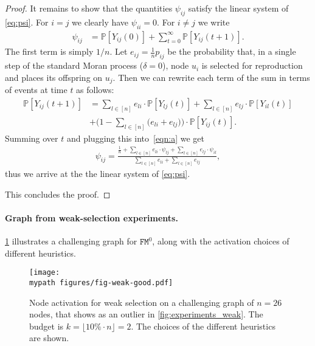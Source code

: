 \documentclass[letterpaper]{article}
\def\mypath{}
\def\Pr{\mathbb{P}}
\newcommand{\NodeActivationMoranWeak}{\texttt{FM}^{0}}
\newcommand{\FitAdv}{\delta}
\begin{document}
\begin{proof}
It remains to show that the quantities $\psi_{ij}$ satisfy the linear system of \cref{eq:psi}.
For $i=j$ we clearly have $\psi_{ii}=0$.
For $i\neq j$ we write
\begin{align}\label{eqn:a}
\psi_{ij}  &=\Pr[Y_{ij}(0)] + \sum_{t=0}^{\infty}\Pr[Y_{ij}(t+1)].
\end{align}
The first term is simply $1/n$.
Let $e_{ij}=\frac{1}{n}p_{ij}$ be the probability that, in a single step of the standard Moran process ($\FitAdv=0$), node $u_i$ is selected for reproduction and places its offspring on $u_j$. 
Then we can rewrite each term of the sum in terms of events at time $t$ as follows:
\begin{align*}
\Pr[Y_{ij}(t+1)] &= \sum_{l\in[n]} e_{li}\cdot \Pr[Y_{lj}(t)]+  \sum_{l\in[n]} e_{lj}\cdot \Pr[Y_{il}(t)]\\
&+\bigg(1-\sum_{l\in[n]} \big(e_{li} + e_{lj}\big)\bigg)\cdot \Pr[Y_{ij}(t)].
\end{align*}
Summing over $t$ and plugging this into~\cref{eqn:a} we get
\begin{align*}
 \psi_{ij}= \frac{ \frac1n + \sum_{l\in[n]} e_{li}\cdot \psi_{lj} +  \sum_{l\in[n]} e_{lj}\cdot \psi_{il} }
 {  \sum_{l\in[n]} e_{li}+ \sum_{l\in[n]} e_{lj}  },
\end{align*}
thus we arrive at the the linear system of \cref{eq:psi}.

This concludes the proof.
\end{proof}


\paragraph{Graph from weak-selection experiments.}
\cref{fig:weak_graph} illustrates a challenging graph for $\NodeActivationMoranWeak$, along with the activation choices of different heuristics.

\begin{figure}[!ht]
\texttt{[image: \\mypath figures/fig-weak-good.pdf]}
\caption{
Node activation for weak selection on a challenging graph of $n=26$ nodes,
that shows as an outlier in \cref{fig:experiments_weak}.
The budget is $k=\lfloor 10\% \cdot n \rfloor=2$.
The choices of the different heuristics are shown.
}
\label{fig:weak_graph}
\end{figure}
\end{document}
